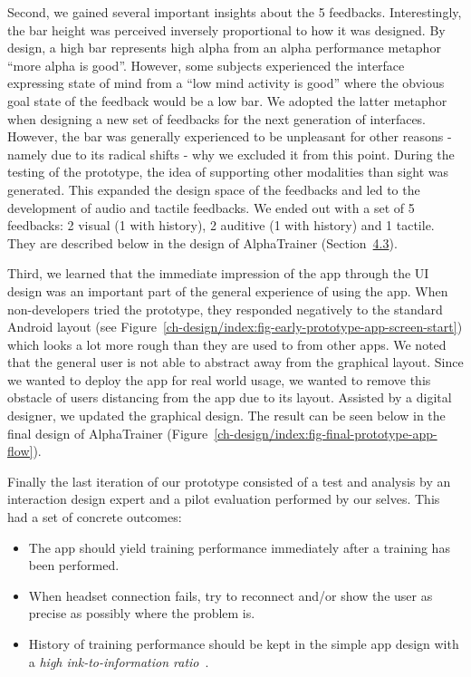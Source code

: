 \documentclass[a4paper,10pt,english,lof,lot,twoside]{puthesis}
\begin{document}
Second, we gained several important insights about the 5
feedbacks. Interestingly, the bar height was perceived inversely proportional to
how it was designed. By design, a high bar represents high alpha from an alpha
performance metaphor ``more alpha is good''. However, some subjects experienced
the interface expressing state of mind from a ``low mind activity is good'' where
the obvious goal state of the feedback would be a low bar. We adopted the latter
metaphor when designing a new set of feedbacks for the next generation of
interfaces. However, the bar was generally experienced to be unpleasant for
other reasons - namely due to its radical shifts - why we excluded it from this
point. During the testing of the prototype, the idea of supporting other
modalities than sight was generated. This expanded the design space of the
feedbacks and led to the development of audio and tactile feedbacks. We ended
out with a set of 5 feedbacks: 2 visual (1 with history), 2 auditive (1 with
history) and 1 tactile. They are described below in the design of AlphaTrainer
(Section {\hyperref[ch-design/index:ch-design-alphatrainer]{4.3}}).

Third, we learned that the immediate impression of the app through the UI design
was an important part of the general experience of using the app. When
non-developers tried the prototype, they responded negatively to the standard
Android layout (see Figure \ref{ch-design/index:fig-early-prototype-app-screen-start})
which looks a lot more rough than they are used to from other apps.  We noted
that the general user is not able to abstract away from the graphical
layout. Since we wanted to deploy the app for real world usage, we wanted to
remove this obstacle of users distancing from the app due to its
layout. Assisted by a digital designer, we updated the graphical design.  The
result can be seen below in the final design of AlphaTrainer (Figure \ref{ch-design/index:fig-final-prototype-app-flow}).

Finally the last iteration of our prototype consisted of a test and analysis by
an interaction design expert and a pilot evaluation performed by our
selves. This had a set of concrete outcomes:
\begin{itemize}
\item {} 
The app should yield training performance immediately after a training has
been performed.

\item {} 
When headset connection fails, try to reconnect and/or show the user as
precise as possibly where the problem is.

\item {} 
History of training performance should be kept in the simple app design with a \emph{high
ink-to-information ratio} \cite{tufte_envisioning_1990}.

\end{itemize}
\end{document}
